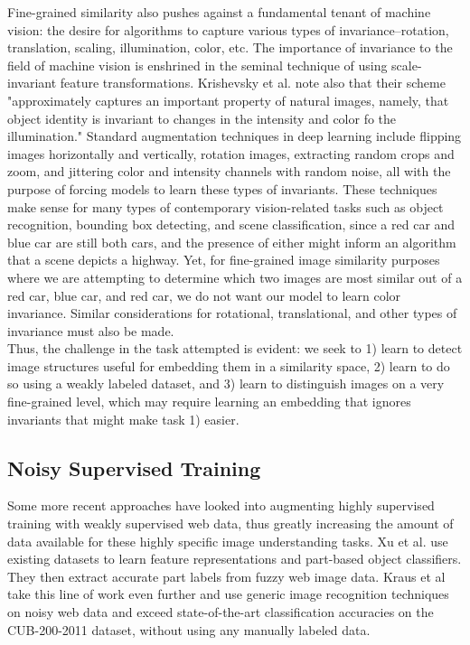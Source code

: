 \documentclass[pageno]{jpaper}
\begin{document}
Fine-grained similarity also pushes against a fundamental tenant of machine vision: the desire for algorithms to capture various types of invariance--rotation, translation, scaling, illumination, color, etc. The importance of invariance to the field of machine vision is enshrined in the seminal technique of using scale-invariant feature transformations. Krishevsky et al. note also that their scheme "approximately captures an important property of natural images, namely, that object identity is invariant to changes in the intensity and color fo the illumination."\cite{krizhevsky2012imagenet} Standard augmentation techniques in deep learning include flipping images horizontally and vertically, rotation images, extracting random crops and zoom, and jittering color and intensity channels with random noise, all with the purpose of forcing models to learn these types of invariants. These techniques make sense for many types of contemporary vision-related tasks such as object recognition, bounding box detecting, and scene classification, since a red car and blue car are still both cars, and the presence of either might inform an algorithm that a scene depicts a highway. Yet, for fine-grained image similarity purposes where we are attempting to determine which two images are most similar out of a red car, blue car, and red car, we do not want our model to learn color invariance. Similar considerations for rotational, translational, and other types of invariance must also be made.\\

Thus, the challenge in the task attempted is evident: we seek to 1) learn to detect image structures useful for embedding them in a similarity space, 2) learn to do so using a weakly labeled dataset, and 3) learn to distinguish images on a very fine-grained level, which may require learning an embedding that ignores invariants that might make task 1) easier.

\subsection*{Noisy Supervised Training}

Some more recent approaches have looked into augmenting highly supervised training with weakly supervised web data, thus greatly increasing the amount of data available for these highly specific image understanding tasks. Xu et al.\cite{xu2015augmenting} use existing datasets to learn feature representations and part-based object classifiers. They then extract accurate part labels from fuzzy web image data. Kraus et al take this line of work even further and use generic image recognition techniques on noisy web data and exceed state-of-the-art classification accuracies on the CUB-200-2011 dataset, without using any manually labeled data.\cite{krause2016unreasonable}\\
\end{document}
